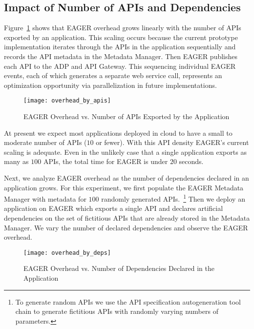 \subsection{Impact of Number of APIs and Dependencies}

Figure~\ref{fig:overhead_by_apis} shows that EAGER overhead grows linearly
with the number of APIs exported by an application.  This scaling occurs
because the current prototype implementation iterates through the APIs in the
application sequentially and records the API metadata in the Metadata Manager.
Then EAGER publishes each API to the ADP and API Gateway. This sequencing
individual EAGER events, each of which generates a separate web service call,
represents an optimization opportunity via parallelization in future implementations.

\begin{figure}
\centering
\texttt{[image: overhead\_by\_apis]}
\caption{EAGER Overhead vs. Number of APIs Exported by the Application}
\label{fig:overhead_by_apis}
\end{figure}

At present we expect most applications deployed in cloud to have a small to 
moderate number of APIs ($10$ or fewer).  With this API density EAGER's current 
scaling is adequate.  Even in the
unlikely case that a single application exports as many as $100$ APIs,
the total time for EAGER is under $20$ seconds.

Next, we analyze EAGER overhead as the number of dependencies declared in
an application grows. For this experiment, we first populate the EAGER
Metadata Manager with metadata for $100$ randomly 
generated APIs.~\footnote{To generate random APIs we use the API specification
autogeneration tool chain to generate
fictitious APIs with randomly varying numbers of parameters.}
Then we
deploy an application on EAGER which exports a single API and declares
artificial dependencies on the set of fictitious 
APIs that are already stored in the Metadata Manager. We
vary the number of declared dependencies and observe the EAGER overhead.

\begin{figure}
\centering
\texttt{[image: overhead\_by\_deps]}
\caption{EAGER Overhead vs. Number of Dependencies Declared in the Application}
\label{fig:overhead_by_deps}
\end{figure}

